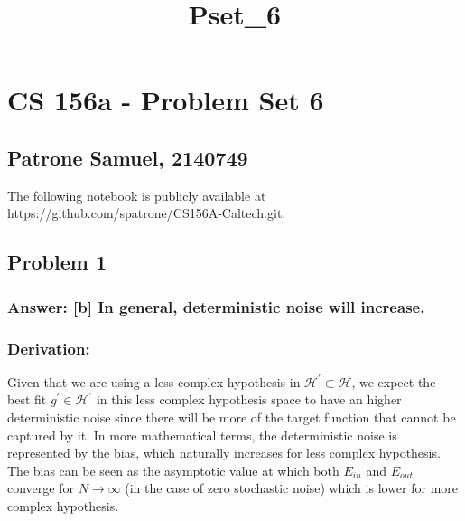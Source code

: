 \documentclass[11pt]{article}
\title{Pset\_6}
\begin{document}
    
    \maketitle
    
    

    
    \hypertarget{cs-156a---problem-set-6}{%
\section{CS 156a - Problem Set 6}\label{cs-156a---problem-set-6}}

\hypertarget{patrone-samuel-2140749}{%
\subsection{Patrone Samuel, 2140749}\label{patrone-samuel-2140749}}

The following notebook is publicly available at
https://github.com/spatrone/CS156A-Caltech.git.

    \hypertarget{problem-1}{%
\subsection{Problem 1}\label{problem-1}}

\hypertarget{answer-b-in-general-deterministic-noise-will-increase.}{%
\subsubsection{Answer: {[}b{]} In general, deterministic noise will
increase.}\label{answer-b-in-general-deterministic-noise-will-increase.}}

\hypertarget{derivation}{%
\subsubsection{Derivation:}\label{derivation}}

Given that we are using a less complex hypothesis in
\(\mathcal{H}^\prime\subset\mathcal{H}\), we expect the best fit
\(g^\prime\in\mathcal{H}^\prime\) in this less complex hypothesis space
to have an higher deterministic noise since there will be more of the
target function that cannot be captured by it. In more mathematical
terms, the deterministic noise is represented by the bias, which
naturally increases for less complex hypothesis. The bias can be seen as
the asymptotic value at which both \(E_{in}\) and \(E_{out}\) converge
for \(N\to\infty\) (in the case of zero stochastic noise) which is lower
for more complex hypothesis.
\end{document}
